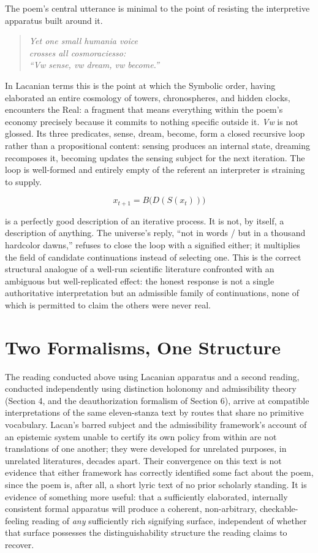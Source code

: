 \documentclass[11pt]{article}
\begin{document}
The poem's central utterance is minimal to the point of resisting the interpretive apparatus built around it.

\begin{quote}
\itshape
Yet one small humania voice\\
crosses all cosmoraciesso:\\[4pt]
``Vw sense, vw dream, vw become.''
\end{quote}

In Lacanian terms this is the point at which the Symbolic order, having elaborated an entire cosmology of towers, chronospheres, and hidden clocks, encounters the Real: a fragment that means everything within the poem's economy precisely because it commits to nothing specific outside it. \emph{Vw} is not glossed. Its three predicates, sense, dream, become, form a closed recursive loop rather than a propositional content: sensing produces an internal state, dreaming recomposes it, becoming updates the sensing subject for the next iteration. The loop is well-formed and entirely empty of the referent an interpreter is straining to supply.

\[
x_{t+1} = B\big(D(S(x_t))\big)
\]

is a perfectly good description of an iterative process. It is not, by itself, a description of anything. The universe's reply, ``not in words / but in a thousand hardcolor dawns,'' refuses to close the loop with a signified either; it multiplies the field of candidate continuations instead of selecting one. This is the correct structural analogue of a well-run scientific literature confronted with an ambiguous but well-replicated effect: the honest response is not a single authoritative interpretation but an admissible family of continuations, none of which is permitted to claim the others were never real.

\section{Two Formalisms, One Structure}

The reading conducted above using Lacanian apparatus and a second reading, conducted independently using distinction holonomy and admissibility theory (Section 4, and the deauthorization formalism of Section 6), arrive at compatible interpretations of the same eleven-stanza text by routes that share no primitive vocabulary. Lacan's barred subject and the admissibility framework's account of an epistemic system unable to certify its own policy from within are not translations of one another; they were developed for unrelated purposes, in unrelated literatures, decades apart. Their convergence on this text is not evidence that either framework has correctly identified some fact about the poem, since the poem is, after all, a short lyric text of no prior scholarly standing. It is evidence of something more useful: that a sufficiently elaborated, internally consistent formal apparatus will produce a coherent, non-arbitrary, checkable-feeling reading of \emph{any} sufficiently rich signifying surface, independent of whether that surface possesses the distinguishability structure the reading claims to recover.
\end{document}
